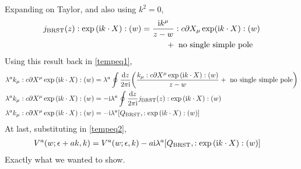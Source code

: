 Expanding on Taylor, and also using $k^2=0$,
\begin{align*}
    j_{\textnormal{BRST}}\qty(z):\exp\qty(\textnormal{i} k\cdot X):\qty(w)&=\frac{\textnormal{i} k^\mu}{z-w}:{c\partial X_\mu\exp(\textnormal{i} k\cdot X)}:(w)\\
    &\quad\quad\quad+\textnormal{ no single simple pole}
\end{align*}
Using this result back in \cref{tempeq1},
\begin{align*}
    \lambda^ak_\mu\cnord{c\partial X^\mu\exp\qty(\im k\cdot X)}\qty(w)&=\lambda^a\oint\frac{\dd{z}}{2\pi\im}\qty(\frac{k_\mu\cnord{c\partial X^\mu\exp\qty(\im k\cdot X)}\qty(w)}{z-w}+\textnormal{ no single simple pole})\\
    \lambda^ak_\mu\cnord{c\partial X^\mu\exp\qty(\im k\cdot X)}\qty(w)&=-\im\lambda^a\oint\frac{\dd{z}}{2\pi\im}j_{\textnormal{BRST}}\qty(z)\cnord{\exp\qty(\im k\cdot X)}\qty(w)\\
    \lambda^ak_\mu\cnord{c\partial X^\mu\exp\qty(\im k\cdot X)}\qty(w)&=-\im\lambda^a\comm{Q_{\textnormal{BRST}}}{\cnord{\exp\qty(\im k\cdot X)}\qty(w)}
\end{align*}
At last, substituting in \cref{tempeq2},
\begin{align*}
    V^a\qty(w;\epsilon+ak,k)&=V^a\qty(w;\epsilon,k)-a\im\lambda^a\comm{Q_{\textnormal{BRST}}}{\cnord{\exp\qty(\im k\cdot X)}\qty(w)}
\end{align*}
Exactly what we wanted to show.

\probitem{}

